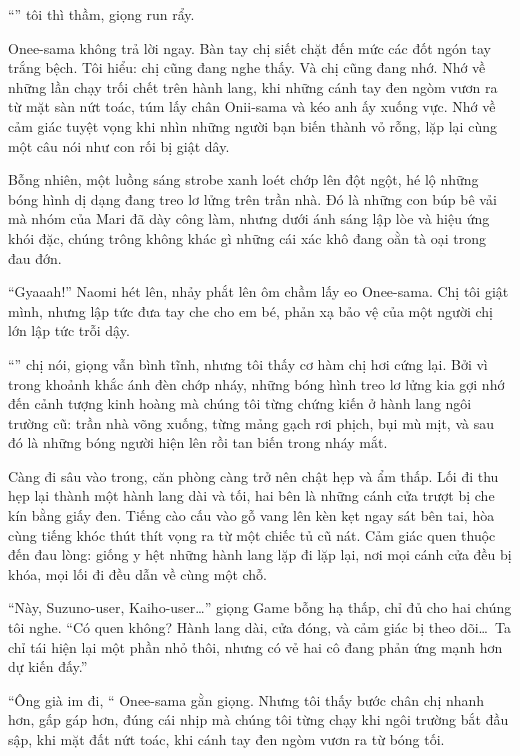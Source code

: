 \documentclass[../main.tex]{subfiles}
\begin{document}
``'' tôi thì thầm, giọng run rẩy.

Onee-sama không trả lời ngay. Bàn tay chị siết chặt đến mức các đốt ngón tay trắng bệch. Tôi hiểu: chị cũng đang nghe thấy. Và chị cũng đang nhớ. Nhớ về những lần chạy trối chết trên hành lang, khi những cánh tay đen ngòm vươn ra từ mặt sàn nứt toác, túm lấy chân Onii-sama và kéo anh ấy xuống vực. Nhớ về cảm giác tuyệt vọng khi nhìn những người bạn biến thành vỏ rỗng, lặp lại cùng một câu nói như con rối bị giật dây.

Bỗng nhiên, một luồng sáng strobe xanh loét chớp lên đột ngột, hé lộ những bóng hình dị dạng đang treo lơ lửng trên trần nhà. Đó là những con búp bê vải mà nhóm của Mari đã dày công làm, nhưng dưới ánh sáng lập lòe và hiệu ứng khói đặc, chúng trông không khác gì những cái xác khô đang oằn tà oại trong đau đớn.

``Gyaaah!'' Naomi hét lên, nhảy phắt lên ôm chầm lấy eo Onee-sama. Chị tôi giật mình, nhưng lập tức đưa tay che cho em bé, phản xạ bảo vệ của một người chị lớn lập tức trỗi dậy.

``'' chị nói, giọng vẫn bình tĩnh, nhưng tôi thấy cơ hàm chị hơi cứng lại. Bởi vì trong khoảnh khắc ánh đèn chớp nháy, những bóng hình treo lơ lửng kia gợi nhớ đến cảnh tượng kinh hoàng mà chúng tôi từng chứng kiến ở hành lang ngôi trường cũ: trần nhà võng xuống, từng mảng gạch rơi phịch, bụi mù mịt, và sau đó là những bóng người hiện lên rồi tan biến trong nháy mắt.

Càng đi sâu vào trong, căn phòng càng trở nên chật hẹp và ẩm thấp. Lối đi thu hẹp lại thành một hành lang dài và tối, hai bên là những cánh cửa trượt bị che kín bằng giấy đen. Tiếng cào cấu vào gỗ vang lên kèn kẹt ngay sát bên tai, hòa cùng tiếng khóc thút thít vọng ra từ một chiếc tủ cũ nát. Cảm giác quen thuộc đến đau lòng: giống y hệt những hành lang lặp đi lặp lại, nơi mọi cánh cửa đều bị khóa, mọi lối đi đều dẫn về cùng một chỗ.

``Này, Suzuno-user, Kaiho-user\dots'' giọng Game bỗng hạ thấp, chỉ đủ cho hai chúng tôi nghe. ``Có quen không? Hành lang dài, cửa đóng, và cảm giác bị theo dõi\dots\ Ta chỉ tái hiện lại một phần nhỏ thôi, nhưng có vẻ hai cô đang phản ứng mạnh hơn dự kiến đấy.''

``Ông già im đi, `` Onee-sama gằn giọng. Nhưng tôi thấy bước chân chị nhanh hơn, gấp gáp hơn, đúng cái nhịp mà chúng tôi từng chạy khi ngôi trường bắt đầu sập, khi mặt đất nứt toác, khi cánh tay đen ngòm vươn ra từ bóng tối.
\end{document}
